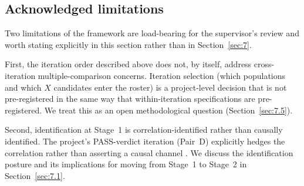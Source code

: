 \subsection{Acknowledged limitations}

Two limitations of the framework are load-bearing for the supervisor's
review and worth stating explicitly in this section rather than in
Section~\ref{sec:7}.

First, the iteration order described above does not, by itself, address
cross-iteration multiple-comparison concerns. Iteration selection (which
populations and which \(X\) candidates enter the roster) is a project-level
decision that is not pre-registered in the same way that within-iteration
specifications are pre-registered. We treat this as an open methodological
question (Section~\ref{sec:7.5}).

Second, identification at Stage~1 is correlation-identified rather than
causally identified. The project's PASS-verdict iteration (Pair~D)
explicitly hedges the correlation rather than asserting a causal channel
\citep[per the closure memo
\texttt{memory/project\_pair\_d\_phase2\_pass.md}, Reality-Checker
FLAG~\#1]{}. We discuss the identification posture and its implications for
moving from Stage~1 to Stage~2 in Section~\ref{sec:7.1}.
